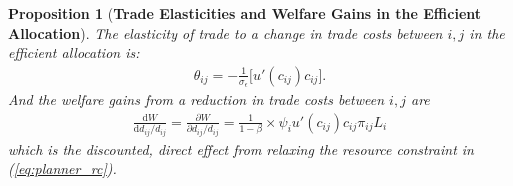 \documentclass[12pt,pdftex]{article}
\newtheorem{prp}{Proposition}
\begin{document}
\begin{onehalfspacing}
\begin{prp}[\textbf{Trade Elasticities and Welfare Gains in the Efficient Allocation}]\label{apx-prp:gains-efficient-allocation} The elasticity of trade to a change in trade costs between $i,j$ in the efficient allocation is:
\begin{align}
\theta_{ij} =  -\frac{1}{\sigma_{\epsilon}} \bigg [ u'(c_{ij}) c_{ij} \bigg]. \label{apx-eq:eff-trade-elasticity}
\end{align}
And the welfare gains from a reduction in trade costs between $i,j$ are
\begin{align}
\frac{\mathrm{d} W}{\mathrm{d} d_{ij} / d_{ij}} = \frac{\partial W}{\partial d_{ij} / d_{ij}} = \frac{1}{1-\beta} \times \psi_{i} u'(c_{ij}) c_{ij} \pi_{ij} L_i
\label{apx-eq:eff-trade-gains}
\end{align}
which is the discounted, direct effect from relaxing the resource constraint in (\ref{eq:planner_rc}).
\end{prp}


\end{onehalfspacing}
\end{document}
